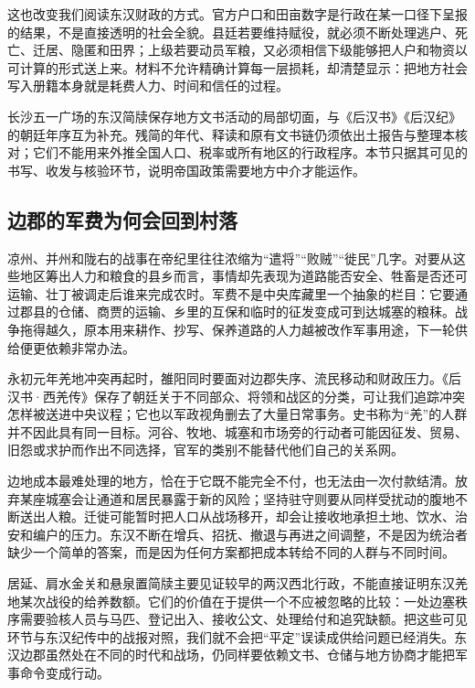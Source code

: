 这也改变我们阅读东汉财政的方式。官方户口和田亩数字是行政在某一口径下呈报的结果，不是直接透明的社会全貌。县廷若要维持赋役，就必须不断处理逃户、死亡、迁居、隐匿和田界；上级若要动员军粮，又必须相信下级能够把人户和物资以可计算的形式送上来。材料不允许精确计算每一层损耗，却清楚显示：把地方社会写入册籍本身就是耗费人力、时间和信任的过程。

\begin{sourcenote}
长沙五一广场的东汉简牍保存地方文书活动的局部切面，与《后汉书》《后汉纪》的朝廷年序互为补充。残简的年代、释读和原有文书链仍须依出土报告与整理本核对；它们不能用来外推全国人口、税率或所有地区的行政程序。本节只据其可见的书写、收发与核验环节，说明帝国政策需要地方中介才能运作。
\end{sourcenote}

\subsection{边郡的军费为何会回到村落}

凉州、并州和陇右的战事在帝纪里往往浓缩为“遣将”“败贼”“徙民”几字。对要从这些地区筹出人力和粮食的县乡而言，事情却先表现为道路能否安全、牲畜是否还可运输、壮丁被调走后谁来完成农时。军费不是中央库藏里一个抽象的栏目：它要通过郡县的仓储、商贾的运输、乡里的互保和临时的征发变成可到达城塞的粮秣。战争拖得越久，原本用来耕作、抄写、保养道路的人力越被改作军事用途，下一轮供给便更依赖非常办法。

永初元年羌地冲突再起时，雒阳同时要面对边郡失序、流民移动和财政压力。《后汉书·西羌传》保存了朝廷关于不同部众、将领和战区的分类，可让我们追踪冲突怎样被送进中央议程；它也以军政视角删去了大量日常事务。史书称为“羌”的人群并不因此具有同一目标。河谷、牧地、城塞和市场旁的行动者可能因征发、贸易、旧怨或求护而作出不同选择，官军的类别不能替代他们自己的关系网。

边地成本最难处理的地方，恰在于它既不能完全不付，也无法由一次付款结清。放弃某座城塞会让通道和居民暴露于新的风险；坚持驻守则要从同样受扰动的腹地不断送出人粮。迁徙可能暂时把人口从战场移开，却会让接收地承担土地、饮水、治安和编户的压力。东汉不断在增兵、招抚、撤退与再进之间调整，不是因为统治者缺少一个简单的答案，而是因为任何方案都把成本转给不同的人群与不同时间。

居延、肩水金关和悬泉置简牍主要见证较早的两汉西北行政，不能直接证明东汉羌地某次战役的给养数额。它们的价值在于提供一个不应被忽略的比较：一处边塞秩序需要验核人员与马匹、登记出入、接收公文、处理给付和追究缺额。把这些可见环节与东汉纪传中的战报对照，我们就不会把“平定”误读成供给问题已经消失。东汉边郡虽然处在不同的时代和战场，仍同样要依赖文书、仓储与地方协商才能把军事命令变成行动。

